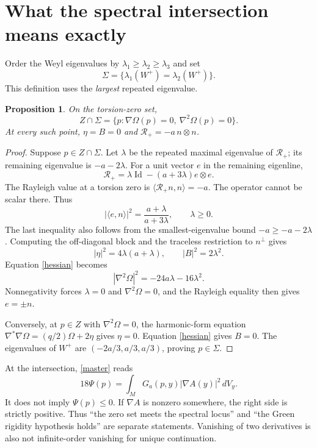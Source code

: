 \documentclass[11pt]{article}
\newtheorem{proposition}{Proposition}[section]
\newcommand{\Id}{\operatorname{Id}}
\newcommand{\RR}{\mathcal R_+}
\begin{document}
\section{What the spectral intersection means exactly}
Order the Weyl eigenvalues by $\lambda_1\ge\lambda_2\ge\lambda_3$ and set
\[
\Sigma=\{\lambda_1(W^+)=\lambda_2(W^+)\}.
\]
This definition uses the \emph{largest} repeated eigenvalue.

\begin{proposition}\label{intersection}
On the torsion-zero set,
\[
\boxed{Z\cap\Sigma
=\{p:\nabla\Omega(p)=0,\ \nabla^2\Omega(p)=0\}.}
\]
At every such point, $\eta=B=0$ and $\RR=-a\,n\otimes n$.
\end{proposition}
\begin{proof}
Suppose $p\in Z\cap\Sigma$. Let $\lambda$ be the repeated maximal
eigenvalue of $\RR$; its remaining eigenvalue is $-a-2\lambda$.
For a unit vector $e$ in the remaining eigenline,
\[
\RR=\lambda\Id-(a+3\lambda)e\otimes e.
\]
The Rayleigh value at a torsion zero is $\langle\RR n,n\rangle=-a$.
The operator cannot be scalar there. Thus
\[
|\langle e,n\rangle|^2=\frac{a+\lambda}{a+3\lambda},\qquad
\lambda\ge0.
\]
The last inequality also follows from the smallest-eigenvalue bound
$-a\ge-a-2\lambda$. Computing the off-diagonal block and the traceless
restriction to $n^\perp$ gives
\[
|\eta|^2=4\lambda(a+\lambda),\qquad |B|^2=2\lambda^2.
\]
Equation \eqref{hessian} becomes
\[
|\nabla^2\Omega|^2=-24a\lambda-16\lambda^2.
\]
Nonnegativity forces $\lambda=0$ and $\nabla^2\Omega=0$, and the
Rayleigh equality then gives $e=\pm n$.

Conversely, at $p\in Z$ with $\nabla^2\Omega=0$, the harmonic-form
equation $\nabla^*\nabla\Omega=(q/2)\Omega+2\eta$ gives $\eta=0$.
Equation \eqref{hessian} gives $B=0$. The eigenvalues of $W^+$ are
$(-2a/3,a/3,a/3)$, proving $p\in\Sigma$.
\end{proof}

At the intersection, \eqref{master} reads
\begin{equation}\label{intersectiongreen}
\boxed{18\Psi(p)=\int_MG_a(p,y)|\nabla A(y)|^2\,dV_y.}
\end{equation}
It does not imply $\Psi(p)\le0$. If $\nabla A$ is nonzero somewhere,
the right side is strictly positive. Thus ``the zero set meets the
spectral locus'' and ``the Green rigidity hypothesis holds'' are separate
statements. Vanishing of two derivatives is also not infinite-order
vanishing for unique continuation.
\end{document}
